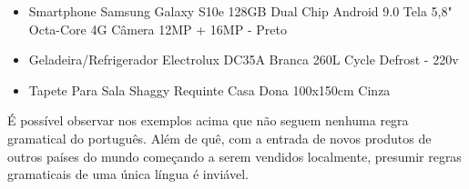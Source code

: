 \begin{itemize}
\item Smartphone Samsung Galaxy S10e 128GB Dual Chip Android 9.0 Tela 5,8" Octa-Core 4G Câmera 12MP + 16MP - Preto
\item Geladeira/Refrigerador Electrolux DC35A Branca 260L Cycle Defrost - 220v
\item Tapete Para Sala Shaggy Requinte Casa Dona 100x150cm Cinza
\end{itemize}


É possível observar nos exemplos acima que não seguem nenhuma regra gramatical do português. Além de quê, com a entrada de novos produtos de outros países do mundo começando a serem vendidos localmente, presumir regras gramaticais de uma única língua é inviável.